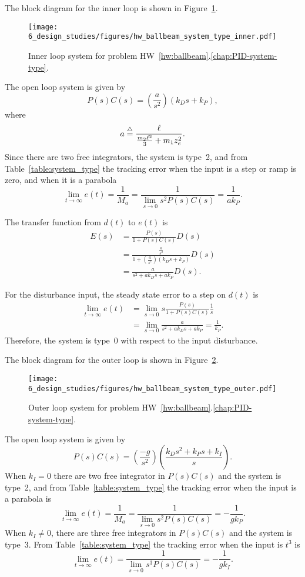 
The block diagram for the inner loop is shown in Figure~\ref{fig:hw_ballbeam_system_type_inner}.
\begin{figure}[H]
   \centering
   \texttt{[image: 6\_design\_studies/figures/hw\_ballbeam\_system\_type\_inner.pdf]}
   \caption{Inner loop system for problem HW~\ref{hw:ballbeam}.\ref{chap:PID-system-type}.}
   \label{fig:hw_ballbeam_system_type_inner}
\end{figure}
The open loop system is given by
\[
P(s)C(s) = \left(\frac{a}{s^2}\right)\left(k_Ds+k_P\right),
\]
where
\[
a \stackrel{\triangle}{=} \frac{\ell}{\frac{m_2\ell^2}{3}+m_1z_e^2}.
\]
Since there are two free integrators, the system is type~2, and from Table~\ref{table:system_type} the tracking error when the input is a step or ramp is zero, and when it is a parabola
\[
\lim_{t\to\infty}e(t) = \frac{1}{M_a} = \frac{1}{\lim_{s\to 0} s^2P(s)C(s)} = \frac{1}{ak_P}.
\]

The transfer function from $d(t)$ to $e(t)$ is
\begin{align*}
E(s) &= \frac{P(s)}{1+P(s)C(s)}D(s) \\
     &= \frac{\frac{a}{s^2}}{1+\left(\frac{a}{s^2}\right)(k_D s+k_P)}D(s) \\
     &= \frac{a}{s^2+ak_Ds+ak_P}D(s).
\end{align*}

For the disturbance input, the steady state error to a step on $d(t)$ is
\begin{align*}
\lim_{t\to\infty}e(t) &= \lim_{s\to 0}s\frac{P(s)}{1+P(s)C(s)}\frac{1}{s} \\
&= \lim_{s\to 0} \frac{a}{s^2+ak_Ds+ak_P} = \frac{1}{k_P}.
\end{align*}
Therefore, the system is type~0 with respect to the input disturbance.

The block diagram for the outer loop is shown in Figure~\ref{fig:hw_ballbeam_system_type_outer}.
\begin{figure}[H]
   \centering
   \texttt{[image: 6\_design\_studies/figures/hw\_ballbeam\_system\_type\_outer.pdf]}
   \caption{Outer loop system for problem HW~\ref{hw:ballbeam}.\ref{chap:PID-system-type}.}
   \label{fig:hw_ballbeam_system_type_outer}
\end{figure}
The open loop system is given by
\[
P(s)C(s) = \left(\frac{-g}{s^2}\right)\left(\frac{k_Ds^2+k_Ps+k_I}{s}\right).
\]
When $k_I=0$ there are two free integrator in $P(s)C(s)$ and the system is type~2, and from Table~\ref{table:system_type} the tracking error when the input is a parabola is \[
\lim_{t\to\infty}e(t) = \frac{1}{M_a} = \frac{1}{\lim_{s\to 0} s^2P(s)C(s)} = -\frac{1}{gk_P}.
\]
When $k_I\neq 0$, there are three free integrators in $P(s)C(s)$ and the system is type~3.  From Table~\ref{table:system_type} the tracking error when the input is $t^3$ is 
\[
\lim_{t\to\infty}e(t) = \frac{1}{\lim_{s\to 0} s^3P(s)C(s)} =- \frac{1}{gk_I}.
\]


